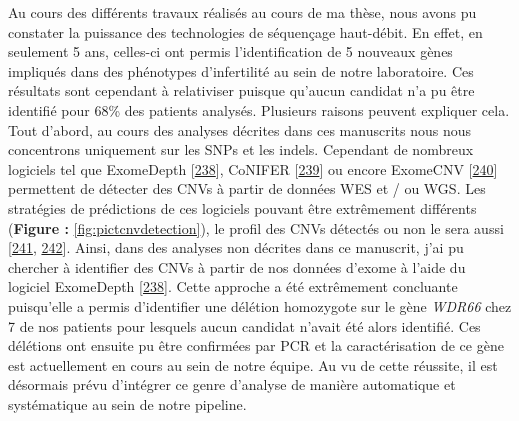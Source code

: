 \documentclass[12pt,a4paper,twoside]{ugathesis}
\theoremstyle{definition}
\theoremstyle{definition}
\theoremstyle{definition}
\theoremstyle{remark}
\begin{document}
Au cours des différents travaux réalisés au cours de ma thèse, nous
avons pu constater la puissance des technologies de séquençage
haut-débit. En effet, en seulement 5 ans, celles-ci ont permis
l'identification de 5 nouveaux gènes impliqués dans des phénotypes
d'infertilité au sein de notre laboratoire. Ces résultats sont cependant
à relativiser puisque qu'aucun candidat n'a pu être identifié pour 68\%
des patients analysés. Plusieurs raisons peuvent expliquer cela. Tout
d'abord, au cours des analyses décrites dans ces manuscrits nous nous
concentrons uniquement sur les SNPs et les indels. Cependant de nombreux
logiciels tel que ExomeDepth
{[}\protect\hyperlink{ref-Plagnol2012}{238}{]}, CoNIFER
{[}\protect\hyperlink{ref-Krumm2012}{239}{]} ou encore ExomeCNV
{[}\protect\hyperlink{ref-Sathirapongsasuti2011}{240}{]} permettent de
détecter des CNVs à partir de données WES et / ou WGS. Les stratégies de
prédictions de ces logiciels pouvant être extrêmement différents
(\textbf{Figure : }\ref{fig:pictcnvdetection}), le profil des CNVs
détectés ou non le sera aussi {[}\protect\hyperlink{ref-Zhao2013}{241},
\protect\hyperlink{ref-Guo2013}{242}{]}. Ainsi, dans des analyses non
décrites dans ce manuscrit, j'ai pu chercher à identifier des CNVs à
partir de nos données d'exome à l'aide du logiciel ExomeDepth
{[}\protect\hyperlink{ref-Plagnol2012}{238}{]}. Cette approche a été
extrêmement concluante puisqu'elle a permis d'identifier une délétion
homozygote sur le gène \emph{WDR66} chez 7 de nos patients pour lesquels
aucun candidat n'avait été alors identifié. Ces délétions ont ensuite pu
être confirmées par PCR et la caractérisation de ce gène est
actuellement en cours au sein de notre équipe. Au vu de cette réussite,
il est désormais prévu d'intégrer ce genre d'analyse de manière
automatique et systématique au sein de notre pipeline.
\end{document}

